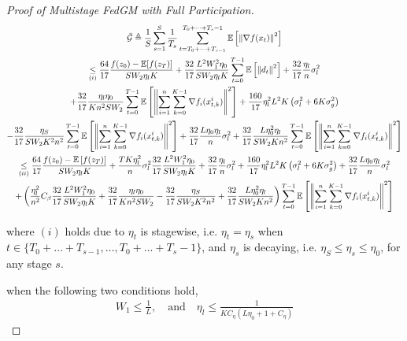 \begin{proof}[Proof of Multistage FedGM with Full Participation]
\begin{equation}
\begin{gathered}
\Bar{\mathcal{G}} \triangleq \frac{1}{S} \sum_{s=1}^{S} \frac{1}{T_s} \sum_{t=T_0+\dots+T_{s-1}}^{T_0+\dots+T_s-1} \mathbb{E}\left[\left\|\nabla f(x_t)\right\|^2\right]\\
\underset{(i)}{\leq} \frac{64}{17}\frac{f(z_0)-\mathbb{E}[f(z_{T})]}{S W_2 \eta_l K} + \frac{32}{17} \frac{L^2 W_1^2 \eta_0}{S W_2\eta_l K}\sum_{t=0}^{T-1}\mathbb{E}\left[\left\| d_t\right\|^2\right]+\frac{32}{17}\frac{\eta_l}{n}\sigma_l^2\\
+\frac{32}{17} \frac{\eta_l\eta_0}{Kn^2 S W_2}\sum_{t=0}^{T-1}\mathbb{E}\left[\left\| \sum_{i=1}^n\sum_{k=0}^{K-1}  \nabla f_i(x_{t,k}^i) \right\|^2\right] +\frac{160}{17} \eta_l^2L^2K \left(\sigma_l^2+6K\sigma_g^2\right)\\
-\frac{32}{17}\frac{\eta_S}{S W_2 K^2 n^2}\sum_{t=0}^{T-1} \mathbb{E}\left[\left\| \sum_{i=1}^n\sum_{k=0}^{K-1} \nabla f_i(x_{t,k}^i)\right\|^2\right] 
+ \frac{32}{17} \frac{L \eta_0 \eta_l }{n}\sigma_l^2 + \frac{32}{17} \frac{L\eta_0^2  \eta_l }{S W_2 K n^2}\sum_{t=0}^{T-1}\mathbb{E}\left[\left\| \sum_{i=1}^n\sum_{k=0}^{K-1}  \nabla f_i(x_{t,k}^i) \right\|^2\right]\\
\underset{(ii)}{\leq} \frac{64}{17}\frac{f(z_0)-\mathbb{E}\left[f(z_{T})\right]}{S W_2 \eta_l K} + \frac{T K\eta_l^2}{n} \sigma^2_l \frac{32}{17} \frac{L^2 W_1^2 \eta_0}{S W_2\eta_l K} 
+\frac{32}{17}\frac{\eta_l}{n}\sigma_l^2  +\frac{160}{17} \eta_l^2L^2K \left(\sigma_l^2+6K\sigma_g^2\right)+\frac{32}{17} \frac{L \eta_0 \eta_l }{n}\sigma_l^2\\
+\left(\frac{\eta^2_l}{n^2} C_\beta \frac{32}{17} \frac{L^2 W_1^2 \eta_0}{S W_2\eta_l K} +  \frac{32}{17} \frac{\eta_l\eta_0}{Kn^2 S W_2} - \frac{32}{17}\frac{\eta_S}{S W_2K^2n^2} + \frac{32}{17} \frac{L\eta_0^2  \eta_l }{S W_2 K n^2} \right)\sum_{t=0}^{T-1}\mathbb{E}\left[\left\| \sum_{i=1}^n\sum_{k=0}^{K-1}  \nabla f_i(x_{t,k}^i) \right\|^2\right]
\end{gathered}\nonumber
\end{equation}

where $(i)$ holds due to $\eta_t$ is stagewise, i.e. $\eta_t=\eta_s$ when $t\in \{T_0+\dots+T_{s-1},\dots,T_0+\dots+T_s-1\}$, and $\eta_s$ is decaying, i.e. $\eta_S \leq \eta_s \leq \eta_0$, for any stage $s$.

when the following two conditions hold,
\begin{equation}
\begin{gathered}
W_1\leq \frac{1}{L}, \quad \text{and} \quad \eta_l\leq \frac{1}{K C_\eta \left(L \eta_0  + 1 + C_\eta \right)}
\end{gathered}\nonumber
\end{equation}


\end{proof}
